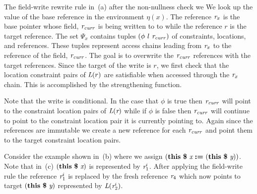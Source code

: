 The field-write rewrite rule in~(a) after the
non-nullness check we We look up the value of the base reference in
the environment $\eta(x)$.  The reference $\emph{r}_x$ is the base pointer
whose field, $\emph{r}_\mathit{curr}$ is being written to to while the
reference $r$ is the target reference. The set $\Psi_x$ contains
tuples $(\phi\ l\ \cfgnt{r}_\mathit{curr})$ of constraints, locations, and
references. These tuples represent access chains leading from $\emph{r}_x$ to
the reference of the field, $\emph{r}_\mathit{curr}$. The goal is to
overwrite the $\emph{r}_\mathit{curr}$ references with the target
references. Since the target of the write is $r$, we first check that
the location constraint pairs of $\emph{L}(r)$ are satisfiable when accessed
through the $\emph{r}_x$ chain. This is accomplished by the strengthening
function.



Note that the write is conditional. In the case that $\phi$ is true
then $\emph{r}_\mathit{curr}$ will point to the constraint location pairs of
$\emph{L}(\emph{r})$ while if $\phi$ is false then $\emph{r}_\mathit{curr}$ will continue
to point to the constraint location pair it is currently pointing to.
Again since the references are immutable we create a new reference for
each $\emph{r}_\mathit{curr}$ and point them to the target constraint
location pairs.

Consider the example shown in~(b) where we assign
$\lp\cfgt{this}\  \cfgt{\$}\ \cfgnt{x}\ \cfgt{:=}\ \lp\cfgt{this}\  \cfgt{\$}\ \cfgnt{y}\rp\rp$. Note that
in~(c) $\lp\cfgt{this}\  \cfgt{\$}\ \cfgnt{x}\rp$ is represented by
$\emph{r}_1^i$. After applying the field-write rule the reference $\emph{r}_1^i$ is
replaced by the fresh reference $\emph{r}_4$ which now points to target
 $\lp\cfgt{this}\  \cfgt{\$}\ \cfgnt{y}\rp$ represented by $\emph{L}(\emph{r}_2^i)$.


\begin{comment}
\begin{figure}[t]
\begin{center}
\begin{tabular}[c]{l}
$\Psi_x = \{ (true\ \cfgnt{l}_0\ \cfgnt{r}_1^i) \}$\\
$ST (\cfgnt{L}, \cfgnt{r}_3^s, \phi, \phi_g)$ \\
$\theta = \{ (\phi_{2a}\; \cfgnt{l}_\mathit{null} ) (\phi_{2b}\; \cfgnt{l}_2) (\phi_{2c}\; \cfgnt{l}_1) \}$\\
$ST(\cfgnt{L}, \cfgnt{r}_0, \phi, \phi_g)$\\
$\theta = \{ \}$\\
\end{tabular}
\end{center}
\caption{FIXME: When will I get a caption}
\label{fig:faHeapSets}
\end{figure}
\end{comment}




